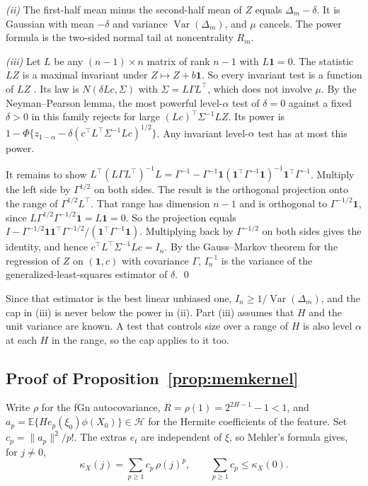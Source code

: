 \documentclass[11pt]{article}
\theoremstyle{remark}
\newcommand{\E}{\mathbb E}
\newcommand{\one}{\mathbf 1}
\newcommand{\Var}{\operatorname{Var}}
\begin{document}
\emph{(ii)} The first-half mean minus the second-half mean of $Z$ equals $\Delta_m-\delta$. It is Gaussian with mean $-\delta$ and variance $\Var(\Delta_m)$, and $\mu$ cancels. The power formula is the two-sided normal tail at noncentrality $R_m$.

\emph{(iii)} Let $L$ be any $(n-1)\times n$ matrix of rank $n-1$ with $L\one=0$. The statistic $LZ$ is a maximal invariant under $Z\mapsto Z+b\one$. So every invariant test is a function of $LZ$ \citep[Theorem~6.2.1]{lehmann2005testing}. Its law is $N(\delta Lc,\Sigma)$ with $\Sigma=L\Gamma L^\top$, which does not involve $\mu$. By the Neyman--Pearson lemma, the most powerful level-$\alpha$ test of $\delta=0$ against a fixed $\delta>0$ in this family rejects for large $(Lc)^\top\Sigma^{-1}LZ$. Its power is $1-\Phi\{z_{1-\alpha}-\delta(c^\top L^\top\Sigma^{-1}Lc)^{1/2}\}$. Any invariant level-$\alpha$ test has at most this power.

It remains to show $L^\top(L\Gamma L^\top)^{-1}L=\Gamma^{-1}-\Gamma^{-1}\one(\one^\top\Gamma^{-1}\one)^{-1}\one^\top\Gamma^{-1}$. Multiply the left side by $\Gamma^{1/2}$ on both sides. The result is the orthogonal projection onto the range of $\Gamma^{1/2}L^\top$. That range has dimension $n-1$ and is orthogonal to $\Gamma^{-1/2}\one$, since $L\Gamma^{1/2}\Gamma^{-1/2}\one=L\one=0$. So the projection equals $I-\Gamma^{-1/2}\one\one^\top\Gamma^{-1/2}/(\one^\top\Gamma^{-1}\one)$. Multiplying back by $\Gamma^{-1/2}$ on both sides gives the identity, and hence $c^\top L^\top\Sigma^{-1}Lc=I_n$. By the Gauss--Markov theorem for the regression of $Z$ on $(\one,c)$ with covariance $\Gamma$, $I_n^{-1}$ is the variance of the generalized-least-squares estimator of $\delta$. \qed

Since that estimator is the best linear unbiased one, $I_n\ge1/\Var(\Delta_m)$, and the cap in (iii) is never below the power in (ii). Part (iii) assumes that $H$ and the unit variance are known. A test that controls size over a range of $H$ is also level $\alpha$ at each $H$ in the range, so the cap applies to it too.

\subsection{Proof of Proposition~\ref{prop:memkernel}}
Write $\rho$ for the fGn autocovariance, $R=\rho(1)=2^{2H-1}-1<1$, and $a_p=\E\{He_p(\xi_0)\phi(X_0)\}\in\mathcal H$ for the Hermite coefficients of the feature. Set $c_p=\|a_p\|^2/p!$. The extras $e_t$ are independent of $\xi$, so Mehler's formula gives, for $j\ne0$,
\[
\kappa_X(j)=\sum_{p\ge1}c_p\,\rho(j)^p,\qquad \sum_{p\ge1}c_p\le\kappa_X(0).
\]
\end{document}
